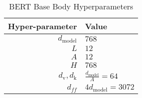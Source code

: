 \begin{table}[h]
\centering
\begin{tabular}{r|l}
\hline
    Hyper-parameter & Value \\
    \hline
     $d_\text{model}$ & $768$ \\
     $L$ & $12$ \\
     $A$ & $12$ \\
     $H$ & $768$ \\
     $d_\text{v}, d_\text{k}$ & $\frac{d_\text{model}}{A} = 64$ \\
     $d_{ff}$ & $4d_\text{model} = 3072$ \\
     \hline
\end{tabular}
\caption{BERT Base Body Hyperparameters \cite{devlin_bert_2019}}
\label{tab:hyperparameters}
\end{table}

